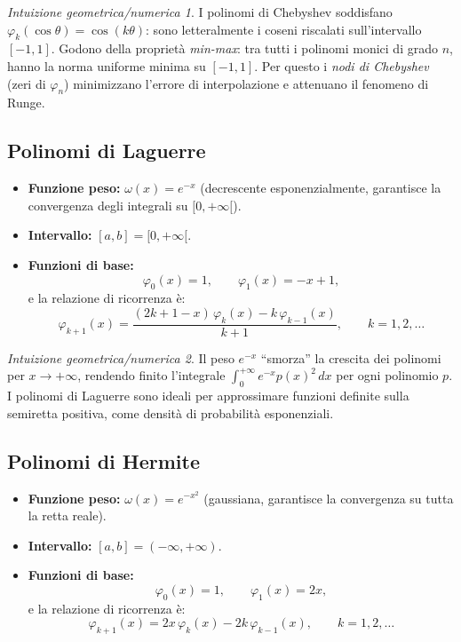 \documentclass[a4paper,12pt]{article}
\theoremstyle{definition}
\theoremstyle{remark}
\newtheorem*{intuizione}{Intuizione geometrica/numerica}
\begin{document}
\begin{intuizione}
I polinomi di Chebyshev soddisfano $\varphi_k(\cos\theta) = \cos(k\theta)$: sono
letteralmente i coseni riscalati sull'intervallo $[-1,1]$. Godono della proprietà
\emph{min-max}: tra tutti i polinomi monici di grado $n$, hanno la norma uniforme
minima su $[-1,1]$. Per questo i \emph{nodi di Chebyshev} (zeri di $\varphi_n$)
minimizzano l'errore di interpolazione e attenuano il fenomeno di Runge.
\end{intuizione}

\subsection{Polinomi di Laguerre}

\begin{itemize}
  \item \textbf{Funzione peso:} $\omega(x) = e^{-x}$
        (decrescente esponenzialmente, garantisce la convergenza degli integrali
        su $[0, +\infty[$).
  \item \textbf{Intervallo:} $[a,b] = [0, +\infty[$.
  \item \textbf{Funzioni di base:}
        \[
          \varphi_0(x) = 1, \qquad \varphi_1(x) = -x + 1,
        \]
        e la relazione di ricorrenza è:
        \begin{equation}
          \boxed{
            \varphi_{k+1}(x)
              = \frac{(2k+1-x)\,\varphi_k(x) - k\,\varphi_{k-1}(x)}{k+1},
            \qquad k = 1, 2, \ldots
          }
        \end{equation}
\end{itemize}

\begin{intuizione}
Il peso $e^{-x}$ ``smorza'' la crescita dei polinomi per $x \to +\infty$, rendendo
finito l'integrale $\int_0^{+\infty} e^{-x} p(x)^2\,dx$ per ogni polinomio $p$.
I polinomi di Laguerre sono ideali per approssimare funzioni definite sulla semiretta
positiva, come densità di probabilità esponenziali.
\end{intuizione}

\subsection{Polinomi di Hermite}

\begin{itemize}
  \item \textbf{Funzione peso:} $\omega(x) = e^{-x^2}$
        (gaussiana, garantisce la convergenza su tutta la retta reale).
  \item \textbf{Intervallo:} $[a,b] = (-\infty, +\infty)$.
  \item \textbf{Funzioni di base:}
        \[
          \varphi_0(x) = 1, \qquad \varphi_1(x) = 2x,
        \]
        e la relazione di ricorrenza è:
        \begin{equation}
          \boxed{
            \varphi_{k+1}(x) = 2x\,\varphi_k(x) - 2k\,\varphi_{k-1}(x),
            \qquad k = 1, 2, \ldots
          }
        \end{equation}
\end{itemize}
\end{document}
